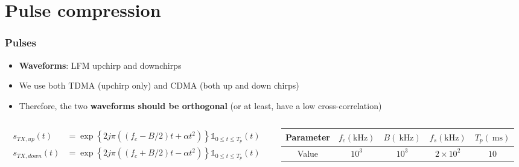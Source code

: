 \documentclass[UKenglish,8pt,aspectratio=1610]{beamer}
\begin{document}
\section{Pulse compression}
\begin{frame}
	\frametitle{Pulses}
\begin{itemize}
	\item \textbf{Waveforms}: LFM upchirp and downchirps
	\item We use both TDMA (upchirp only) and CDMA (both up and down chirps)
	\item Therefore, the two \textbf{waveforms should be orthogonal} (or at least, have a low cross-correlation)
\end{itemize}
\begin{columns}
	\begin{column}{0.5\textwidth}
		\begin{equation*}
			\begin{aligned}
				s_{TX, up}(t) &= \exp\left\{2j\pi\left(\left( f_c - B/2\right)t + \alpha t^2\right)\right\}\mathbb{1}_{0\leq t\leq T_p}(t)\\
				s_{TX, down}(t) &= \exp\left\{2j\pi\left(\left( f_c + B/2\right)t - \alpha t^2\right)\right\}\mathbb{1}_{0\leq t\leq T_p}(t)
			\end{aligned}
		\end{equation*}
	\end{column}
\begin{column}{0.5\textwidth}
\begin{table}
	\begin{tabular}{ccccc}
		\hline
		\hline
		Parameter& $f_c (\si{\kilo\hertz})$& $B (~\si{\kilo\hertz})$ & $f_s (\si{\kilo\hertz})$&$T_p (~\si{\milli\second})$ \\
		\hline
		Value&$10^3$&$10^3$&$2\times 10^2$&$10$\\
		\hline
	\end{tabular}
\end{table}
\end{column}
\end{columns}


\end{frame}
\end{document}

